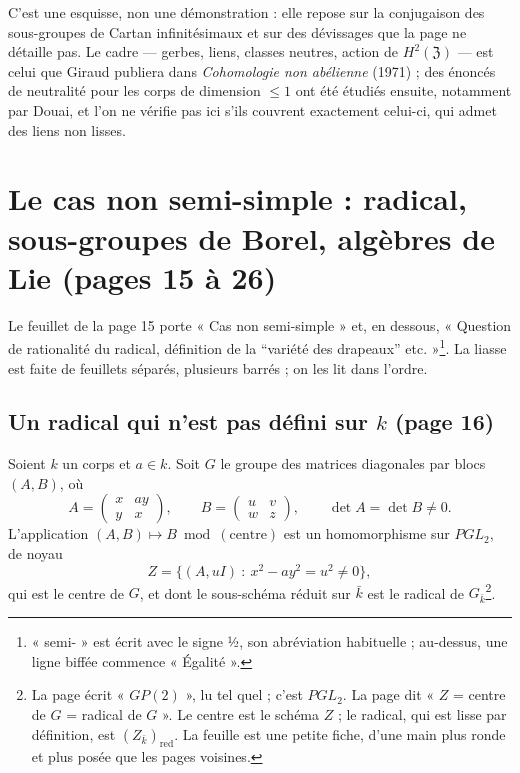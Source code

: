 \documentclass[11pt,a4paper]{article}
\begin{document}
C'est une esquisse, non une démonstration : elle repose sur la conjugaison des
sous-groupes de Cartan infinitésimaux et sur des dévissages que la page ne
détaille pas. Le cadre — gerbes, liens, classes neutres, action de
$H^2(\mathfrak{Z})$ — est celui que Giraud publiera dans \emph{Cohomologie non
abélienne} (1971) ; des énoncés de neutralité pour les corps de dimension
$\leq 1$ ont été étudiés ensuite, notamment par Douai, et l'on ne vérifie pas
ici s'ils couvrent exactement celui-ci, qui admet des liens non lisses.

\section*{Le cas non semi-simple : radical, sous-groupes de Borel, algèbres de Lie (pages 15 à 26)}

Le feuillet de la page 15 porte « Cas non semi-simple » et, en dessous,
« Question de rationalité du radical, définition de la “variété des drapeaux”
etc. »\footnote{« semi- » est écrit avec le signe ½, son abréviation
habituelle ; au-dessus, une ligne biffée commence « Égalité ».}. La liasse est
faite de feuillets séparés, plusieurs barrés ; on les lit dans l'ordre.

\subsection*{Un radical qui n'est pas défini sur $k$ (page 16)}

Soient $k$ un corps et $a \in k$. Soit $G$ le groupe des matrices diagonales par
blocs $(A,B)$, où
\[
A = \begin{pmatrix} x & ay \\ y & x \end{pmatrix}, \qquad
B = \begin{pmatrix} u & v \\ w & z \end{pmatrix}, \qquad
\det A = \det B \neq 0 .
\]
L'application $(A,B) \mapsto B \bmod (\text{centre})$ est un homomorphisme sur
$PGL_2$, de noyau
\[
Z = \{ (A, uI) \ :\ x^2 - ay^2 = u^2 \neq 0 \},
\]
qui est le centre de $G$, et dont le sous-schéma réduit sur $\bar k$ est le
radical de $G_{\bar k}$\footnote{La page écrit « $GP(2)$ », lu tel quel ; c'est
$PGL_2$. La page dit « $Z$ = centre de $G$ = radical de $G$ ». Le centre est le
schéma $Z$ ; le radical, qui est lisse par définition, est $(Z_{\bar k})_{\mathrm{red}}$.
La feuille est une petite fiche, d'une main plus ronde et plus posée que les
pages voisines.}.
\end{document}
